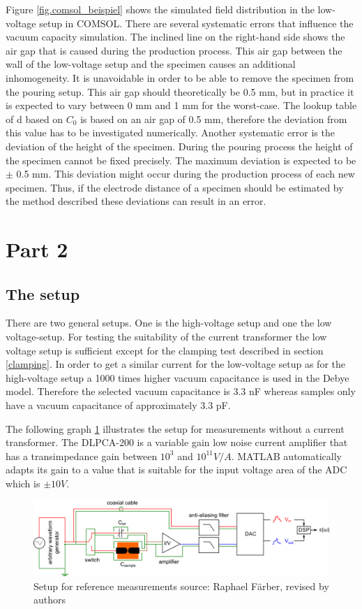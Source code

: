 Figure \ref{fig.comsol_beispiel} shows the simulated field distribution in the low-voltage setup in COMSOL. There are several systematic errors that influence the vacuum capacity simulation. The inclined line on the right-hand side shows the air gap that is caused during the production process. This air gap between the wall of the low-voltage setup and the specimen causes an additional inhomogeneity. It is unavoidable in order to be able to remove the specimen from the pouring setup. This air gap should theoretically be 0.5 mm, but in practice it is expected to vary between 0 mm and 1 mm for the worst-case. The lookup table of d based on $C_0$ is based on an air gap of 0.5 mm, therefore the deviation from this value has to be investigated numerically.
Another systematic error is the deviation of the height of the specimen. During  the pouring process the height of the specimen cannot be fixed precisely. The maximum deviation is expected to be $\pm$ 0.5 mm. This deviation might occur during the production process of each new specimen. Thus, if the electrode distance of a specimen should be estimated by the method described these deviations can result in an error. 
 
\section{Part 2}
\subsection{The setup}
There are two general setups. One is the high-voltage setup and one the low voltage-setup. For testing the suitability of the current transformer the low voltage setup is sufficient except for the clamping test described in section \ref{clamping}. In order to get a similar current for the low-voltage setup as for the high-voltage setup a 1000 times higher vacuum capacitance is used in the Debye model. Therefore the selected vacuum capacitance is 3.3 nF whereas samples only have a vacuum capacitance of approximately 3.3 pF.  

The following graph \ref{sec.setup_amplifier} illustrates the setup for measurements without a current transformer. The DLPCA-200 is a variable gain low noise current amplifier that has a transimpedance gain between $10^3$ and $10^{11} V/A$. MATLAB automatically adapts its gain to a value that is suitable for the input voltage area of the ADC which is $\pm 10V$. 

\begin{figure}[htbp]
	\centering
	\includegraphics[width=\textwidth]{figures/Method/setup/setup_amplifier}		
	\caption[Kurze Abbildungsbeschreibung]{Setup for reference measurements {source: Raphael F\"arber, revised by authors}} 
	\label{sec.setup_amplifier}

\end{figure}

